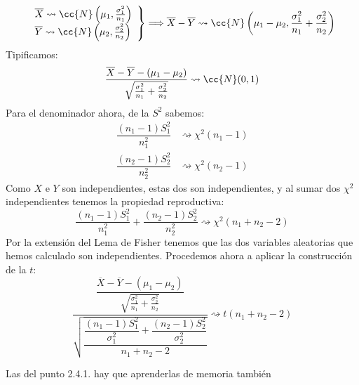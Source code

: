 \begin{coro}
\begin{enumerate}
\begin{equation*}
                \left.\begin{array}{l}
                        \overline{X} \rightsquigarrow \cc{N}\left(\mu_1, \frac{\sigma_1^2}{n_1}\right) \\
                        \overline{Y} \rightsquigarrow \cc{N}\left(\mu_2, \frac{\sigma_2^2}{n_2}\right) 
                \end{array}\right\} \Longrightarrow \overline{X}-\overline{Y} \rightsquigarrow \cc{N}\left(\mu_1-\mu_2, \frac{\sigma_1^2}{n_1}+\frac{\sigma_2^2}{n_2}\right)
            \end{equation*}
            Tipificamos:
            \begin{equation*}
                \dfrac{\overline{X}-\overline{Y}-(\mu_1-\mu_2)}{\sqrt{\frac{\sigma_1^2}{n_1}+\frac{\sigma_2^2}{n_2}}} \rightsquigarrow \cc{N}(0,1)
            \end{equation*}
            Para el denominador ahora, de la $S^2$ sabemos:
            \begin{align*}
                \dfrac{(n_1-1)S_1^2}{n_1^2} &\rightsquigarrow \chi^2(n_1-1) \\
                \dfrac{(n_2-1)S_2^2}{n_2^2} &\rightsquigarrow \chi^2(n_2-1) 
            \end{align*}
            Como $X$ e $Y$ son independientes, estas dos son independientes, y al sumar dos $\chi^2$ independientes tenemos la propiedad reproductiva:
            \begin{equation*}
                \dfrac{(n_1-1)S_1^2}{n_1^2}  + \dfrac{(n_2-1)S_2^2}{n_2^2}  \rightsquigarrow \chi^2(n_1+n_2-2)
            \end{equation*}
            Por la extensión del Lema de Fisher tenemos que las dos variables aleatorias que hemos calculado son independientes. Procedemos ahora a aplicar la construcción de la $t$:
            \begin{equation*}
                \dfrac{\dfrac{\overline{X}-\overline{Y}-(\mu_1-\mu_2)}{\sqrt{\frac{\sigma_1^2}{n_1}+\frac{\sigma_2^2}{n_2}}}}{\sqrt{\dfrac{\dfrac{(n_1-1)S_1^2}{\sigma_1^2} + \dfrac{(n_2-1)S_2^2}{\sigma_2^2}}{n_1+n_2-2}}} \rightsquigarrow t(n_1+n_2-2)
            \end{equation*}
    \end{enumerate}
\end{coro}

Las del punto 2.4.1. hay que aprenderlas de memoria también
